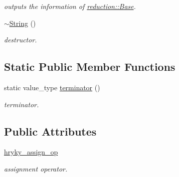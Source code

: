 \begin{DoxyCompactItemize}
\begin{DoxyCompactList}\small\item\em outputs the information of \hyperlink{classhryky_1_1reduction_1_1_base}{reduction\-::\-Base}. \end{DoxyCompactList}\item 
\hypertarget{classhryky_1_1_string_aad9c7884c7afd2b4543b3b90d1c7e0b2}{\hyperlink{classhryky_1_1_string_aad9c7884c7afd2b4543b3b90d1c7e0b2}{$\sim$\-String} ()}\label{classhryky_1_1_string_aad9c7884c7afd2b4543b3b90d1c7e0b2}

\begin{DoxyCompactList}\small\item\em destructor. \end{DoxyCompactList}\end{DoxyCompactItemize}
\subsection*{Static Public Member Functions}
\begin{DoxyCompactItemize}
\item 
\hypertarget{classhryky_1_1_string_ab1308696e8665314373d9aec581a3095}{static value\-\_\-type \hyperlink{classhryky_1_1_string_ab1308696e8665314373d9aec581a3095}{terminator} ()}\label{classhryky_1_1_string_ab1308696e8665314373d9aec581a3095}

\begin{DoxyCompactList}\small\item\em terminator. \end{DoxyCompactList}\end{DoxyCompactItemize}
\subsection*{Public Attributes}
\begin{DoxyCompactItemize}
\item 
\hypertarget{classhryky_1_1_string_a445f0d882e66842a32e855881278cd64}{\hyperlink{classhryky_1_1_string_a445f0d882e66842a32e855881278cd64}{hryky\-\_\-assign\-\_\-op}}\label{classhryky_1_1_string_a445f0d882e66842a32e855881278cd64}

\begin{DoxyCompactList}\small\item\em assignment operator. \end{DoxyCompactList}\end{DoxyCompactItemize}
